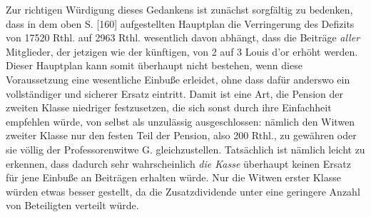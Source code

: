 Zur richtigen Würdigung dieses Gedankens ist zunächst sorgfältig zu bedenken, dass in dem oben S. [160] aufgestellten Hauptplan die Verringerung des Defizits von 17520 Rthl. auf 2963 Rthl. wesentlich davon abhängt, dass die Beiträge \textit{aller} Mitglieder, der jetzigen wie der künftigen, von 2 auf 3 Louis d'or erhöht werden. Dieser Hauptplan kann somit überhaupt nicht bestehen, wenn diese Voraussetzung eine wesentliche Einbuße erleidet, ohne dass dafür anderswo ein vollständiger und sicherer Ersatz eintritt. Damit ist eine Art, die Pension der zweiten Klasse niedriger festzusetzen, die sich sonst durch ihre Einfachheit empfehlen würde, von selbst als unzulässig ausgeschlossen: nämlich den Witwen zweiter Klasse nur den festen Teil der Pension, also 200 Rthl., zu gewähren oder sie völlig der Professorenwitwe G. gleichzustellen. Tatsächlich ist nämlich leicht zu erkennen, dass dadurch sehr wahrscheinlich \textit{die Kasse} überhaupt keinen Ersatz für jene Einbuße an Beiträgen erhalten würde. Nur die Witwen erster Klasse würden etwas besser gestellt, da die Zusatzdividende unter eine geringere Anzahl von Beteiligten verteilt würde.

